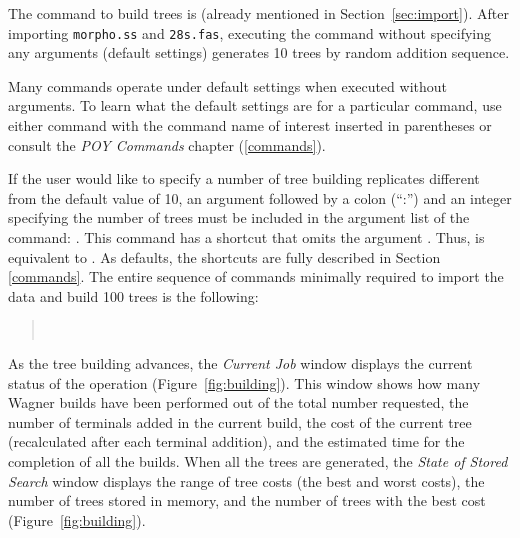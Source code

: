 {The command to build trees is  (already mentioned in Section~\ref{sec:import}). After importing \texttt{morpho.ss} and \texttt{28s.fas}, executing the command  without specifying any arguments (default settings) generates 10 trees by random addition sequence.

Many \poy commands operate under default settings when executed without arguments. To learn what the default settings are for a particular command, use either  command with the command name of interest inserted in parentheses or consult the \emph{POY Commands} chapter (\ref{commands}).

If the user would like to specify a number of tree building replicates different from the default value of 10, an argument  followed by a colon (``:'') and an integer specifying the number of trees must be included in the argument list of the  command: . This command has a shortcut that omits the argument . Thus,  is equivalent to . As defaults, the shortcuts are fully described in Section \ref{commands}. The entire sequence of commands minimally required to import the data and build 100 trees is the following:

\begin{quote}
 	\\
\end{quote}

As the tree building advances, the \emph{Current Job} window displays the current status of the operation (Figure~\ref{fig:building}). This window shows how many Wagner builds have been performed out of the total number requested, the number of terminals added in the current build, the cost of the current tree (recalculated after each terminal addition), and the estimated time for the completion of all the builds. When all the trees are generated, the \emph{State of Stored Search} window displays the range of tree costs (the best and worst costs), the number of trees stored in memory, and the number of trees with the best cost (Figure~\ref{fig:building}).

}

